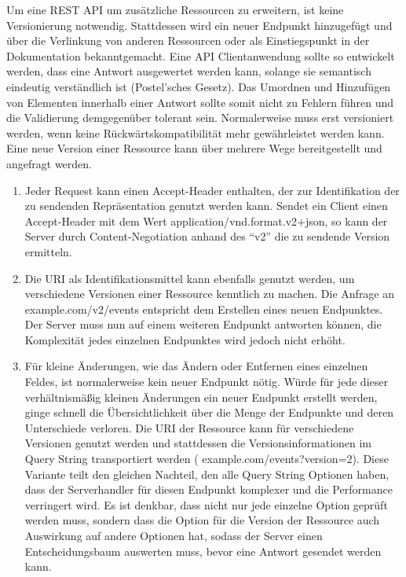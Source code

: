 \par
Um eine REST API um zusätzliche Ressourcen zu erweitern, ist keine Versionierung notwendig.
Stattdessen wird ein neuer Endpunkt hinzugefügt und über die Verlinkung von anderen Ressourcen oder als Einstiegspunkt in der Dokumentation bekanntgemacht.
Eine API Clientanwendung sollte so entwickelt werden, dass eine Antwort ausgewertet werden kann, solange sie semantisch eindeutig verständlich ist (Postel'sches Gesetz).
Das Umordnen und Hinzufügen von Elementen innerhalb einer Antwort sollte somit nicht zu Fehlern führen und die Validierung demgegenüber tolerant sein.
Normalerweise muss erst versioniert werden, wenn keine Rückwärtskompatibilität mehr gewährleistet werden kann.
Eine neue Version einer Ressource kann über mehrere Wege bereitgestellt und angefragt werden.
\begin{enumerate}
  \item Jeder Request kann einen Accept-Header enthalten, der zur Identifikation der zu sendenden Repräsentation genutzt werden kann.
  Sendet ein Client \zB{} einen Accept-Header mit dem Wert application/vnd.format.v2+json, so kann der Server durch Content-Negotiation anhand des \enquote{v2} die zu sendende Version ermitteln.
  \item Die URI als Identifikationsmittel kann ebenfalls genutzt werden, um verschiedene Versionen einer Ressource kenntlich zu machen.
  Die Anfrage an example.com/v2/events entspricht dem Erstellen eines neuen Endpunktes.
  Der Server muss nun auf einem weiteren Endpunkt antworten können, die Komplexität jedes einzelnen Endpunktes wird jedoch nicht erhöht.
  \item Für kleine Änderungen, wie das Ändern oder Entfernen eines einzelnen Feldes, ist normalerweise kein neuer Endpunkt nötig.
  Würde für jede dieser verhältnismäßig kleinen Änderungen ein neuer Endpunkt erstellt werden, ginge schnell die Übersichtlichkeit über die Menge der Endpunkte und deren Unterschiede verloren.
  Die URI der Ressource kann für verschiedene Versionen genutzt werden und stattdessen die Versionsinformationen im Query String transportiert werden (\zB{} example.com/events?version=2).
  Diese Variante teilt den gleichen Nachteil, den alle Query String Optionen haben, dass der Serverhandler für diesen Endpunkt komplexer und die Performance verringert wird.
  Es ist denkbar, dass nicht nur jede einzelne Option geprüft werden muss, sondern dass die Option für die Version der Ressource auch Auswirkung auf andere Optionen hat, sodass der Server einen Entscheidungsbaum auswerten muss, bevor eine Antwort gesendet werden kann.
\end{enumerate}
